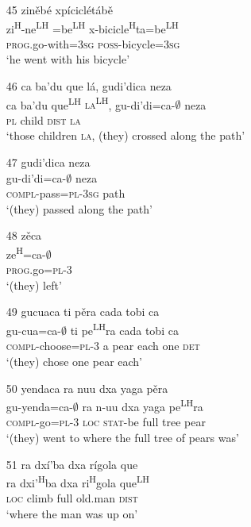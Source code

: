 \begin{itemize}
\item[45]
\glll zin\v{e}b\'{e} xp\'{i}cicl\'{e}t\'{a}b\v{e} \\
zi\textsuperscript{H}-ne\textsuperscript{LH} =be\textsuperscript{LH}  x-bicicle\textsuperscript{H}ta=be\textsuperscript{LH}  \\
 \textsc{prog}.go-with=\textsc{3sg} \textsc{poss}-bicycle=\textsc{3sg} \\
\glt `he went with his bicycle'


\item[46]
\glll ca ba'du que l\'{a},  gudi'dica neza \\
ca ba'du que\textsuperscript{LH}  \textsc{la\textsuperscript{LH}}, gu-di'di=ca-$\emptyset$ neza \\
\textsc{pl} child \textsc{dist} \textsc{la} \\
\glt `those children \textsc{la}, (they) crossed along the path'


\item[47]
\glll gudi'dica neza \\
gu-di'di=ca-$\emptyset$ neza \\
\textsc{compl}-pass=\textsc{pl}-\textsc{3sg} path \\
\glt `(they) passed along the path' 


\item[48]
\glll z\v{e}ca \\
 ze\textsuperscript{H}=ca-$\emptyset$ \\
\textsc{prog}.go=\textsc{pl}-\textsc{3} \\
\glt `(they) left'


\item[49]
\glll gucuaca ti p\v{e}ra cada tobi ca \\
gu-cua=ca-$\emptyset$ ti pe\textsuperscript{LH}ra cada tobi ca \\
\textsc{compl}-choose=\textsc{pl}-\textsc{3} a pear each one \textsc{det} \\
\glt `(they) chose one pear each'


\item[50]
\glll yendaca ra nuu dxa yaga p\v{e}ra \\
gu-yenda=ca-$\emptyset$ ra n-uu dxa yaga pe\textsuperscript{LH}ra \\
\textsc{compl}-go=\textsc{pl}-\textsc{3} \textsc{loc} \textsc{stat}-be full tree pear \\
\glt `(they) went to where the full tree of pears was'


\item[51]
\glll ra dx\'{i}'ba dxa r\'{i}gola que \\
ra dxi'\textsuperscript{H}ba dxa ri\textsuperscript{H}gola que\textsuperscript{LH} \\
\textsc{loc} climb full old.man \textsc{dist} \\
\glt `where the man was up on'



\end{itemize}
